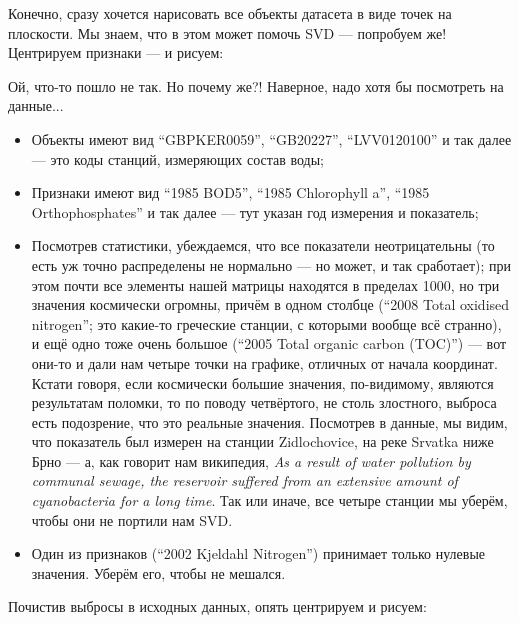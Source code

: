 \documentclass{amsart}
\theoremstyle{definition}
\theoremstyle{remark}
\numberwithin{equation}{section}
\begin{document}
Конечно, сразу хочется нарисовать все объекты датасета в виде точек на плоскости. Мы знаем, что в этом может помочь SVD --- попробуем же! Центрируем признаки --- и рисуем:

\begin{center}
\end{center}

Ой, что-то пошло не так. Но почему же?! Наверное, надо хотя бы посмотреть на данные...
\begin{itemize}
\item Объекты имеют вид ``GBPKER0059'', ``GB20227'', ``LVV0120100'' и так далее --- это коды станций, измеряющих состав воды;
\item Признаки имеют вид ``1985 BOD5'', ``1985 Chlorophyll a'', ``1985 Orthophosphates'' и так далее --- тут указан год измерения и показатель;
\item Посмотрев статистики, убеждаемся, что все показатели неотрицательны (то есть уж точно распределены не нормально --- но может, и так сработает); при этом почти все элементы нашей матрицы находятся в пределах 1000, но три значения космически огромны, причём в одном столбце (``2008 Total oxidised nitrogen''; это какие-то греческие станции, с которыми вообще всё странно), и ещё одно тоже очень большое (``2005 Total organic carbon (TOC)'') --- вот они-то и дали нам четыре точки на графике, отличных от начала координат. Кстати говоря, если космически большие значения, по-видимому, являются результатам поломки, то по поводу четвёртого, не столь злостного, выброса есть подозрение, что это реальные значения. Посмотрев в данные, мы видим, что показатель был измерен на станции Zidlochovice, на реке Srvatka ниже Брно --- а, как говорит нам википедия, \textit{As a result of water pollution by communal sewage, the reservoir suffered from an extensive amount of cyanobacteria for a long time}. Так или иначе, все четыре станции мы уберём, чтобы они не портили нам SVD.
\item Один из признаков (``2002 Kjeldahl Nitrogen'') принимает только нулевые значения. Уберём его, чтобы не мешался. 
\end{itemize}

Почистив выбросы в исходных данных, опять центрируем и рисуем:

\begin{center}
\end{center}
\end{document}
